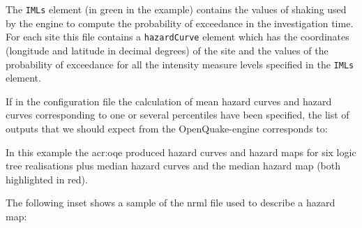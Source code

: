 The \texttt{IMLs} element (in green in the example) contains the values of
shaking used by the engine to compute the probability of exceedance in the
investigation time. For each site this file contains a \texttt{hazardCurve}
element which has the coordinates (longitude and latitude in decimal degrees)
of the site and the values of the probability of exceedance for all the
intensity measure levels specified in the \texttt{IMLs} element.

If in the configuration file the calculation of mean hazard curves and hazard
curves corresponding to one or several percentiles have been specified, the
list of outputs that we should expect from the OpenQuake-engine corresponds
to:



In this example the \gls{acr:oqe} produced hazard curves and hazard maps for
six logic tree realisations plus median hazard curves and the median hazard
map (both highlighted in red).

The following inset shows a sample of the nrml file used to describe a hazard
map:

